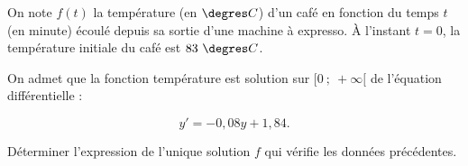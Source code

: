 \medskip

On note $f(t)$ la température (en $\degres C$) d'un café en fonction du temps $t$ (en minute) écoulé depuis sa sortie d'une machine à expresso. À l'instant $t = 0$, la température initiale du café est $83~\degres C$.

On admet que la fonction température est solution sur $[0~;~ +\infty[$ de l'équation différentielle :

\[y' = - 0,08y + 1,84.\]

Déterminer l'expression de l'unique solution $f$ qui vérifie les données précédentes.

\bigskip
